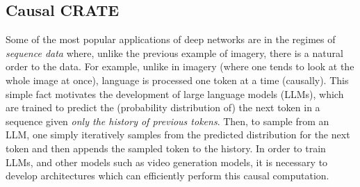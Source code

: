 \documentclass[../../book-main.tex]{subfiles}
\begin{document}
\begin{table}[t!]
\centering
\caption{\small Top-1 classification accuracy of \textsc{crate} on various datasets with different model scales 
when pre-trained on ImageNet-1K. For ImageNet-1K/ImageNet-1K ReaL, we directly evaluate the top-1 accuracy. For other datasets, we use models that are pre-trained on ImageNet as initialization and the evaluate the transfer learning performance via fine-tuning.}
\label{tab:crate_comparison_with_sota}
\small
    \setlength{\tabcolsep}{13.6pt}
\end{table}

\subsection{Causal CRATE}

Some of the most popular applications of deep networks are in the regimes of \textit{sequence data} where, unlike the previous example of imagery, there is a natural order to the data. For example, unlike in imagery (where one tends to look at the whole image at once), language is processed one token at a time (causally). This simple fact motivates the development of large language models (LLMs), which are trained to predict the (probability distribution of) the next token in a sequence given \textit{only the history of previous tokens}. Then, to sample from an LLM, one simply iteratively samples from the predicted distribution for the next token and then appends the sampled token to the history. In order to train LLMs, and other models such as video generation models, it is necessary to develop architectures which can efficiently perform this causal computation.
\end{document}
